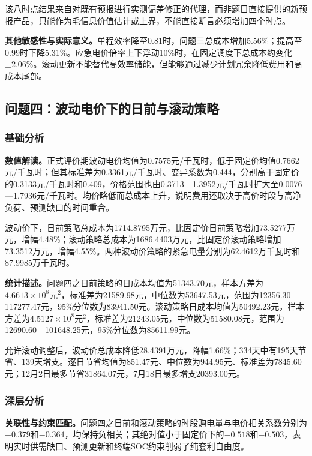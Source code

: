 \documentclass[UTF8,a4paper,12pt,fontset=fandol]{ctexart}
\numberwithin{equation}{section}
\begin{document}
该八时点结果来自对既有预报进行实测偏差修正的代理，而非题目直接提供的新预报产品，只能作为毛信息价值估计或上界，不能直接断言必须增加四个时点。

\textbf{其他敏感性与实际意义。}单程效率降至0.81时，问题三总成本增加5.56\%；提高至0.99时下降5.31\%。应急电价倍率上下浮动10\%时，在固定调度下总成本约变化$\pm2.06\%$。滚动更新不能替代高效率储能，但能够通过减少计划冗余降低费用和高成本尾部。

\subsection{问题四：波动电价下的日前与滚动策略}

\subsubsection{基础分析}

\textbf{数值解读。}正式评价期波动电价均值为0.7575元/千瓦时，低于固定价均值0.7662元/千瓦时；但其标准差为0.3361元/千瓦时、变异系数为0.444，分别高于固定价的0.3133元/千瓦时和0.409，价格范围也由0.3713---1.3952元/千瓦时扩大至0.0076---1.7936元/千瓦时。均价略低而总成本上升，说明费用还取决于高价时段与高净负荷、预测缺口的时间重合。

波动价下，日前策略总成本为1714.8795万元，比固定价日前策略增加73.5277万元，增幅4.48\%；滚动策略总成本为1686.4403万元，比固定价滚动策略增加73.3512万元，增幅4.55\%。两种波动价策略的紧急电量分别为62.4612万千瓦时和87.9985万千瓦时。

\textbf{统计描述。}问题四之日前策略的日成本均值为51343.70元，样本方差为$4.6613\times10^8$元$^2$，标准差为21589.98元，中位数为53647.53元，范围为12356.30---117277.47元，95\%分位数为83941.50元。滚动策略日成本均值为50492.23元，样本方差为$4.5127\times10^8$元$^2$，标准差为21243.05元，中位数为51580.08元，范围为12690.60---101648.25元，95\%分位数为85611.99元。

允许滚动调整后，波动价总成本降低28.4391万元，降幅1.66\%；334天中有195天节省、139天增支。逐日节省均值为851.47元、中位数为944.95元、标准差为7845.60元；12月2日最多节省31864.07元，7月18日最多增支20393.00元。

\subsubsection{深层分析}

\textbf{关联性与约束匹配。}问题四之日前和滚动策略的时段购电量与电价相关系数分别为$-0.379$和$-0.364$，均保持负相关；其绝对值小于固定价下的$-0.518$和$-0.503$，表明实时供需缺口、预测更新和终端SOC约束削弱了纯套利自由度。
\end{document}
